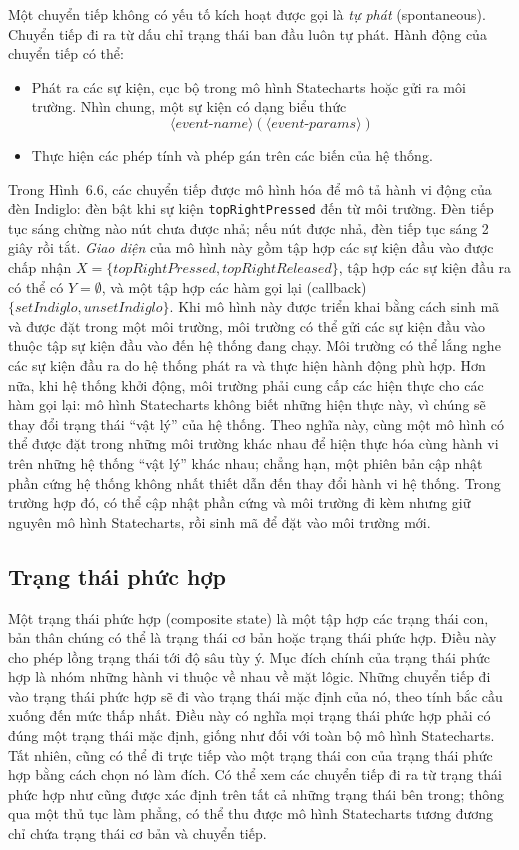 Một chuyển tiếp không có yếu tố kích hoạt được gọi là \emph{tự phát} (spontaneous). Chuyển tiếp đi ra từ dấu chỉ trạng thái ban đầu luôn tự phát. Hành động của chuyển tiếp có thể:
\begin{itemize}
\item Phát ra các sự kiện, cục bộ trong mô hình Statecharts hoặc gửi ra môi trường. Nhìn chung, một sự kiện có dạng biểu thức 
\[
\langle\textit{event-name}\rangle(\langle\textit{event-params}\rangle)
\]

\item Thực hiện các phép tính và phép gán trên các biến của hệ thống.
\end{itemize}

Trong Hình~6.6, các chuyển tiếp được mô hình hóa để mô tả hành vi động của đèn Indiglo: đèn bật khi sự kiện \texttt{topRightPressed} đến từ môi trường. Đèn tiếp tục sáng chừng nào nút chưa được nhả; nếu nút được nhả, đèn tiếp tục sáng 2 giây rồi tắt. \emph{Giao diện} của mô hình này gồm tập hợp các sự kiện đầu vào được chấp nhận $X=\{\textit{topRightPressed},\textit{topRightReleased}\}$, tập hợp các sự kiện đầu ra có thể có $Y=\emptyset$, và một tập hợp các hàm gọi lại (callback) $\{\textit{setIndiglo},\textit{unsetIndiglo}\}$. Khi mô hình này được triển khai bằng cách sinh mã và được đặt trong một môi trường, môi trường có thể gửi các sự kiện đầu vào thuộc tập sự kiện đầu vào đến hệ thống đang chạy. Môi trường có thể lắng nghe các sự kiện đầu ra do hệ thống phát ra và thực hiện hành động phù hợp. Hơn nữa, khi hệ thống khởi động, môi trường phải cung cấp các hiện thực cho các hàm gọi lại: mô hình Statecharts không biết những hiện thực này, vì chúng sẽ thay đổi trạng thái ``vật lý'' của hệ thống. Theo nghĩa này, cùng một mô hình có thể được đặt trong những môi trường khác nhau để hiện thực hóa cùng hành vi trên những hệ thống ``vật lý'' khác nhau; chẳng hạn, một phiên bản cập nhật phần cứng hệ thống không nhất thiết dẫn đến thay đổi hành vi hệ thống. Trong trường hợp đó, có thể cập nhật phần cứng và môi trường đi kèm nhưng giữ nguyên mô hình Statecharts, rồi sinh mã để đặt vào môi trường mới.

\subsection{Trạng thái phức hợp}
Một trạng thái phức hợp (composite state) là một tập hợp các trạng thái con, bản thân chúng có thể là trạng thái cơ bản hoặc trạng thái phức hợp. Điều này cho phép lồng trạng thái tới độ sâu tùy ý. Mục đích chính của trạng thái phức hợp là nhóm những hành vi thuộc về nhau về mặt lôgic. Những chuyển tiếp đi vào trạng thái phức hợp sẽ đi vào trạng thái mặc định của nó, theo tính bắc cầu xuống đến mức thấp nhất. Điều này có nghĩa mọi trạng thái phức hợp phải có đúng một trạng thái mặc định, giống như đối với toàn bộ mô hình Statecharts. Tất nhiên, cũng có thể đi trực tiếp vào một trạng thái con của trạng thái phức hợp bằng cách chọn nó làm đích. Có thể xem các chuyển tiếp đi ra từ trạng thái phức hợp như cũng được xác định trên tất cả những trạng thái bên trong; thông qua một thủ tục làm phẳng, có thể thu được mô hình Statecharts tương đương chỉ chứa trạng thái cơ bản và chuyển tiếp.

